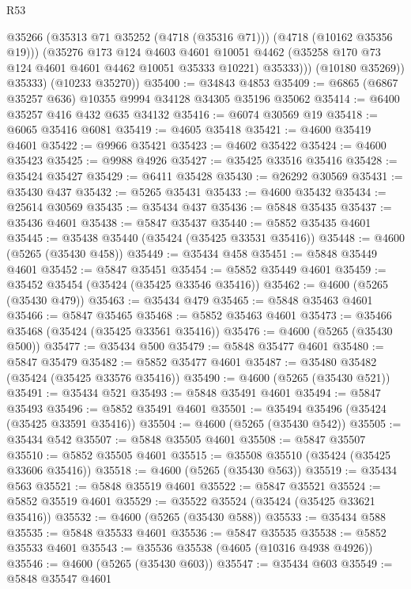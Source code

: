 \begin{lexlean}{R53}
\begin{coremodule}
                @35266
                (@35313 @71 @35252 (@4718 (@35316 @71)))
                (@4718 (@10162 @35356 @19)))
              (@35276
                @173
                @124
                @4603
                @4601
                @10051
                @4462
                (@35258 @170 @73 @124 @4601 @4601 @4462 @10051 @35333 @10221)
                @35333)))
          (@10180 @35269))
        @35333)
      (@10233 @35270))
@35400 := @34843 @4853
@35409 := @6865 (@6867 @35257 @636) @10355 @9994 @34128 @34305 @35196 @35062
@35414 := @6400 @35257 @416 @432 @635 @34132
@35416 := @6074 @30569 @19
@35418 := @6065 @35416 @6081
@35419 := @4605 @35418
@35421 := @4600 @35419 @4601
@35422 := @9966 @35421
@35423 := @4602 @35422
@35424 := @4600 @35423
@35425 := @9988 @4926
@35427 := @35425 @33516 @35416
@35428 := @35424 @35427
@35429 := @6411 @35428
@35430 := @26292 @30569
@35431 := @35430 @437
@35432 := @5265 @35431
@35433 := @4600 @35432
@35434 := @25614 @30569
@35435 := @35434 @437
@35436 := @5848 @35435
@35437 := @35436 @4601
@35438 := @5847 @35437
@35440 := @5852 @35435 @4601
@35445 := @35438 @35440 (@35424 (@35425 @33531 @35416))
@35448 := @4600 (@5265 (@35430 @458))
@35449 := @35434 @458
@35451 := @5848 @35449 @4601
@35452 := @5847 @35451
@35454 := @5852 @35449 @4601
@35459 := @35452 @35454 (@35424 (@35425 @33546 @35416))
@35462 := @4600 (@5265 (@35430 @479))
@35463 := @35434 @479
@35465 := @5848 @35463 @4601
@35466 := @5847 @35465
@35468 := @5852 @35463 @4601
@35473 := @35466 @35468 (@35424 (@35425 @33561 @35416))
@35476 := @4600 (@5265 (@35430 @500))
@35477 := @35434 @500
@35479 := @5848 @35477 @4601
@35480 := @5847 @35479
@35482 := @5852 @35477 @4601
@35487 := @35480 @35482 (@35424 (@35425 @33576 @35416))
@35490 := @4600 (@5265 (@35430 @521))
@35491 := @35434 @521
@35493 := @5848 @35491 @4601
@35494 := @5847 @35493
@35496 := @5852 @35491 @4601
@35501 := @35494 @35496 (@35424 (@35425 @33591 @35416))
@35504 := @4600 (@5265 (@35430 @542))
@35505 := @35434 @542
@35507 := @5848 @35505 @4601
@35508 := @5847 @35507
@35510 := @5852 @35505 @4601
@35515 := @35508 @35510 (@35424 (@35425 @33606 @35416))
@35518 := @4600 (@5265 (@35430 @563))
@35519 := @35434 @563
@35521 := @5848 @35519 @4601
@35522 := @5847 @35521
@35524 := @5852 @35519 @4601
@35529 := @35522 @35524 (@35424 (@35425 @33621 @35416))
@35532 := @4600 (@5265 (@35430 @588))
@35533 := @35434 @588
@35535 := @5848 @35533 @4601
@35536 := @5847 @35535
@35538 := @5852 @35533 @4601
@35543 := @35536 @35538 (@4605 (@10316 @4938 @4926))
@35546 := @4600 (@5265 (@35430 @603))
@35547 := @35434 @603
@35549 := @5848 @35547 @4601

\end{coremodule}
\end{lexlean}

